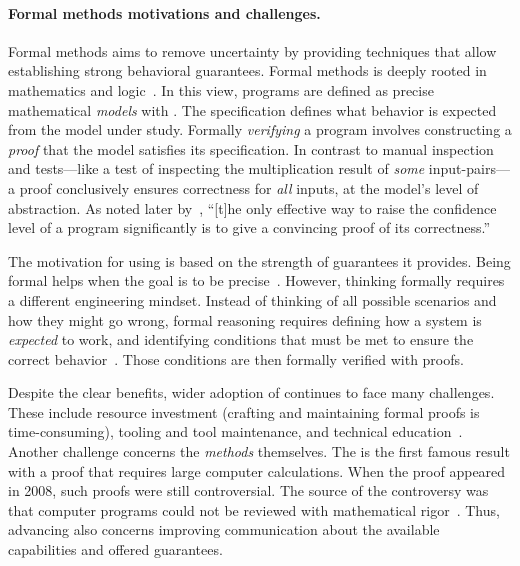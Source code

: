 \paragraph*{Formal methods motivations and challenges.}
Formal methods aims to remove uncertainty by providing
techniques that allow establishing strong behavioral guarantees. Formal
methods is deeply rooted in mathematics and
logic~\cite{shankar2023}. In this view, programs are defined as precise
mathematical \emph{models} with . The specification defines
what behavior is expected from the model under study. Formally
\emph{verifying} a program involves constructing a
\emph{proof} that the model satisfies its specification.
In contrast to manual inspection and tests---like a test
of inspecting the multiplication result of \emph{some} input-pairs---a proof
conclusively ensures correctness for \emph{all} inputs, at the model's level of
abstraction. As noted later by~\textcite{dijkstra1972}, \enquote{{[t]he only
effective way to raise the confidence level of a program significantly is to
give a convincing proof of its correctness.}}

The motivation for using  is based on the strength of
guarantees it provides. Being formal helps when the goal is to be
precise~\cite{leino2023}. However, thinking formally requires a different
engineering mindset. Instead of thinking of all possible scenarios and how they
might go wrong, formal reasoning requires defining how a system is
\emph{expected} to work, and identifying conditions that must be met to ensure
the correct behavior~\cite{aws2024}. Those conditions are then formally
verified with proofs.

Despite the clear benefits, wider adoption of  continues to
face many challenges. These include \eg resource investment (crafting and
maintaining formal proofs is time-consuming), tooling and tool maintenance, and
technical education~\cite{beek2024}. Another challenge concerns the
\emph{methods} themselves. The  is the first famous
result with a proof that requires large computer calculations. When the proof
appeared in 2008, such proofs were still controversial. The source of the
controversy was that computer programs could not be reviewed with mathematical
rigor~\cite{gonthier2008}. Thus, advancing  also concerns
improving communication about the available capabilities and offered guarantees.

